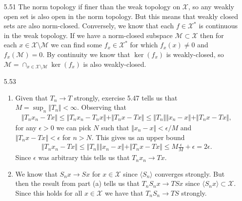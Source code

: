 \documentclass[11pt,letter]{article}
\begin{document}
\begin{enumerate}
\item [5.51] The norm topology if finer than the weak topology on $\mathcal{X}$, so any weakly open set is also open in the norm topology. But this means that weakly closed sets are also norm-closed. Conversely, we know that each $f \in \mathcal{X}^*$ is continuous in the weak topology. If we have a norm-closed subspace $\mathcal{M} \subset \mathcal{X}$ then for each $x \in \mathcal{X}\setminus\mathcal{M}$ we can find some $f_x \in \mathcal{X}^*$ for which $f_x(x) \ne 0$ and $f_x(\mathcal{M})=0$. By continuity we know that $\ker(f_x)$ is weakly-closed, so $\mathcal{M} = \cap_{x\in\mathcal{X}\setminus\mathcal{M}} \ker(f_x)$ is also weakly-closed.

\item [5.53] \begin{enumerate} 
    \item Given that $T_n \rightarrow T$ strongly, exercise 5.47 tells us that $M = \sup_n \Vert T_n \Vert < \infty$. Observing that
    \begin{align*} 
        \Vert T_n x_n - Tx \Vert \le \Vert T_n x_n - T_n x \Vert + \Vert T_n x - Tx \Vert \le \Vert T_n \Vert \Vert x_n - x \Vert +\Vert T_n x - T x \Vert,
    \end{align*}
    for any $\epsilon > 0$ we can pick $N$ such that $\Vert x_n - x \Vert < \epsilon/M$ and $\Vert T_n x - Tx \Vert < \epsilon$ for $n > N$. This gives us an upper bound
    \begin{align*}
        \Vert T_n x_n - Tx \Vert \le \Vert T_n \Vert \Vert x_n - x \Vert +\Vert T_n x - T x \Vert \le M \frac{\epsilon}{M} + \epsilon = 2\epsilon.
    \end{align*}
    Since $\epsilon$ was arbitrary this tells us that $T_nx_n \rightarrow Tx$.

    \item We know that $S_nx \rightarrow Sx$ for $x \in \mathcal{X}$ since $\langle S_n \rangle$ converges strongly. But then the result from part (a) tells us that $T_nS_nx \rightarrow TSx$ since $\langle S_nx \rangle \subset \mathcal{X}$. Since this holds for all $x \in \mathcal{X}$ we have that $T_nS_n \rightarrow TS$ strongly.
    \end{enumerate}
\end{enumerate}
\end{document}
